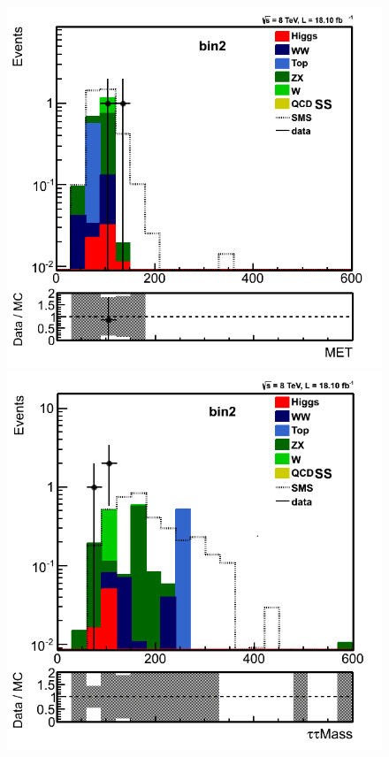 \begin{figure}[!Hhtb]
\centering
\includegraphics[angle=0,scale=0.35]{TauTauFigs/met_bin2_14nov.png}
\includegraphics[angle=0,scale=0.35]{TauTauFigs/zveto_bin2_14nov.png}

\end{figure}
